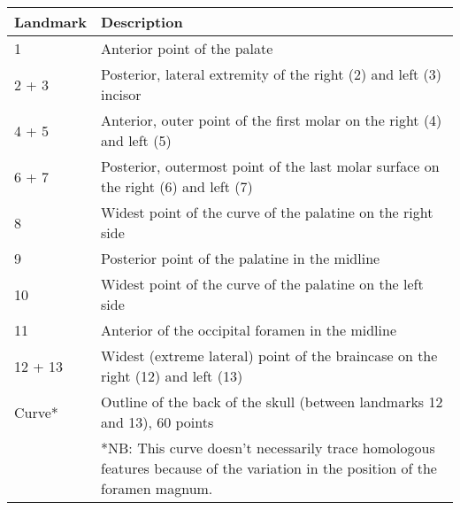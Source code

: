 \begin{tabular}[t]{p{2cm} p{13cm}}		
\hline
\textbf{Landmark} & \textbf{Description} \\
\hline
1 & Anterior point of the palate\\
2 + 3 & Posterior, lateral extremity of the right (2) and left (3) incisor\\
4 + 5 & Anterior, outer point of the first molar on the right (4) and left (5)\\
6 + 7 & Posterior, outermost point of the last molar surface on the right (6) and left (7) \\
8 & Widest point of the curve of the palatine on the right side\\
9 & Posterior point of the palatine in the midline\\
10 & Widest point of the curve of the palatine on the left side\\
11 & Anterior of the occipital foramen in the midline\\
12 + 13 & Widest (extreme lateral) point of the braincase on the right (12) and left (13)\\
Curve* & Outline of the back of the skull (between landmarks 12 and 13), 60 points \\
\hline
&*NB: This curve doesn't necessarily trace homologous features because of the variation in the position of the foramen magnum.
\end{tabular}